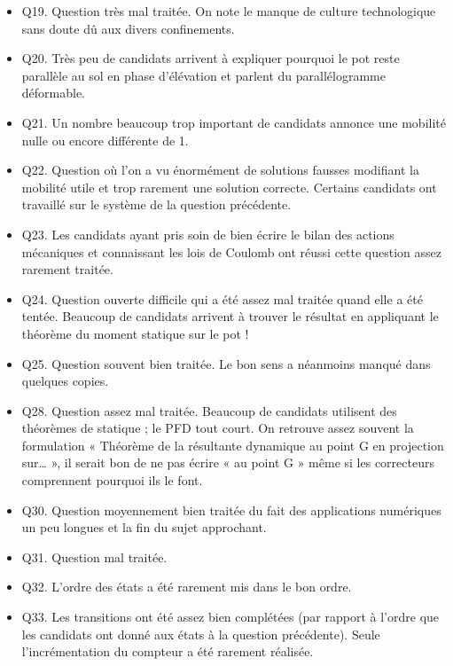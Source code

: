 \documentclass[10pt,fleqn]{article} %
\begin{document}
\begin{itemize}
\item Q19. Question très mal traitée. On note le manque de culture technologique sans doute dû aux divers
confinements.
\item Q20. Très peu de candidats arrivent à expliquer pourquoi le pot reste parallèle au sol en phase d’élévation et
parlent du parallélogramme déformable.
\item Q21. Un nombre beaucoup trop important de candidats annonce une mobilité nulle ou encore différente de 1.
\item Q22. Question où l’on a vu énormément de solutions fausses modifiant la mobilité utile et trop rarement une
solution correcte. Certains candidats ont travaillé sur le système de la question précédente.
\item Q23. Les candidats ayant pris soin de bien écrire le bilan des actions mécaniques et connaissant les lois de
Coulomb ont réussi cette question assez rarement traitée.
\item Q24. Question ouverte difficile qui a été assez mal traitée quand elle a été tentée. Beaucoup de candidats
arrivent à trouver le résultat en appliquant le théorème du moment statique sur le pot !
\item Q25. Question souvent bien traitée. Le bon sens a néanmoins manqué dans quelques copies.
\item Q28. Question assez mal traitée. Beaucoup de candidats utilisent des théorèmes de statique ; le PFD tout
court. On retrouve assez souvent la formulation « Théorème de la résultante dynamique au point G en
projection sur… », il serait bon de ne pas écrire « au point G » même si les correcteurs comprennent
pourquoi ils le font.
\item Q30. Question moyennement bien traitée du fait des applications numériques un peu longues et la fin du
sujet approchant.
\item Q31. Question mal traitée.
\item Q32. L’ordre des états a été rarement mis dans le bon ordre.
\item Q33. Les transitions ont été assez bien complétées (par rapport à l’ordre que les candidats ont donné aux
états à la question précédente). Seule l’incrémentation du compteur a été rarement réalisée.
\end{itemize}
%
\end{document}
